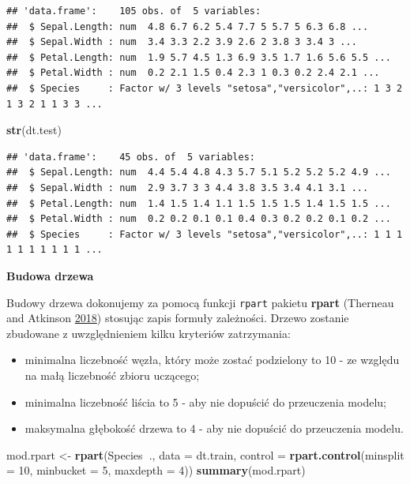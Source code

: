 \documentclass[
]{book}
\newenvironment{Shaded}{\begin{snugshade}}{\end{snugshade}}
\newcommand{\DataTypeTok}[1]{\textcolor[rgb]{0.13,0.29,0.53}{#1}}
\newcommand{\DecValTok}[1]{\textcolor[rgb]{0.00,0.00,0.81}{#1}}
\newcommand{\KeywordTok}[1]{\textcolor[rgb]{0.13,0.29,0.53}{\textbf{#1}}}
\newcommand{\NormalTok}[1]{#1}
\newcommand{\OperatorTok}[1]{\textcolor[rgb]{0.81,0.36,0.00}{\textbf{#1}}}
\newcommand{\StringTok}[1]{\textcolor[rgb]{0.31,0.60,0.02}{#1}}
\providecommand{\tightlist}{%
  \setlength{\itemsep}{0pt}\setlength{\parskip}{0pt}}
\theoremstyle{plain}
\theoremstyle{definition}
\theoremstyle{definition}
\theoremstyle{definition}
\theoremstyle{definition}
\theoremstyle{remark}
\begin{document}
\begin{verbatim}
## 'data.frame':    105 obs. of  5 variables:
##  $ Sepal.Length: num  4.8 6.7 6.2 5.4 7.7 5 5.7 5 6.3 6.8 ...
##  $ Sepal.Width : num  3.4 3.3 2.2 3.9 2.6 2 3.8 3 3.4 3 ...
##  $ Petal.Length: num  1.9 5.7 4.5 1.3 6.9 3.5 1.7 1.6 5.6 5.5 ...
##  $ Petal.Width : num  0.2 2.1 1.5 0.4 2.3 1 0.3 0.2 2.4 2.1 ...
##  $ Species     : Factor w/ 3 levels "setosa","versicolor",..: 1 3 2 1 3 2 1 1 3 3 ...
\end{verbatim}

\begin{Shaded}
\begin{Highlighting}[]
\KeywordTok{str}\NormalTok{(dt.test)}
\end{Highlighting}
\end{Shaded}

\begin{verbatim}
## 'data.frame':    45 obs. of  5 variables:
##  $ Sepal.Length: num  4.4 5.4 4.8 4.3 5.7 5.1 5.2 5.2 5.2 4.9 ...
##  $ Sepal.Width : num  2.9 3.7 3 3 4.4 3.8 3.5 3.4 4.1 3.1 ...
##  $ Petal.Length: num  1.4 1.5 1.4 1.1 1.5 1.5 1.5 1.4 1.5 1.5 ...
##  $ Petal.Width : num  0.2 0.2 0.1 0.1 0.4 0.3 0.2 0.2 0.1 0.2 ...
##  $ Species     : Factor w/ 3 levels "setosa","versicolor",..: 1 1 1 1 1 1 1 1 1 1 ...
\end{verbatim}

\textbf{Budowa drzewa}

Budowy drzewa dokonujemy za pomocą funkcji \texttt{rpart} pakietu \textbf{rpart} (Therneau and Atkinson \protect\hyperlink{ref-R-rpart}{2018}) stosując zapis formuły zależności. Drzewo zostanie zbudowane z uwzględnieniem kilku kryteriów zatrzymania:

\begin{itemize}
\tightlist
\item
  minimalna liczebność węzła, który może zostać podzielony to 10 - ze względu na małą liczebność zbioru uczącego;
\item
  minimalna liczebność liścia to 5 - aby nie dopuścić do przeuczenia modelu;
\item
  maksymalna głębokość drzewa to 4 - aby nie dopuścić do przeuczenia modelu.
\end{itemize}

\begin{Shaded}
\begin{Highlighting}[]
\NormalTok{mod.rpart <-}\StringTok{ }\KeywordTok{rpart}\NormalTok{(Species}\OperatorTok{~}\NormalTok{., }\DataTypeTok{data =}\NormalTok{ dt.train, }
                   \DataTypeTok{control =} \KeywordTok{rpart.control}\NormalTok{(}\DataTypeTok{minsplit =} \DecValTok{10}\NormalTok{,}
                                           \DataTypeTok{minbucket =} \DecValTok{5}\NormalTok{,}
                                           \DataTypeTok{maxdepth =} \DecValTok{4}\NormalTok{))}
\KeywordTok{summary}\NormalTok{(mod.rpart)}
\end{Highlighting}
\end{Shaded}
\end{document}
